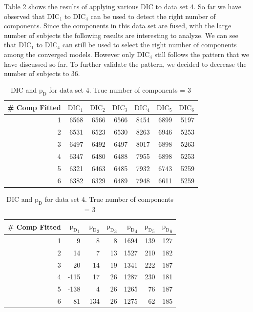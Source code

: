 Table \ref{table : ds_3fused_10ppg_dic} shows the results of applying various DIC to data set 4. So far we have observed that $\text{DIC}_1$ to $\text{DIC}_4$ can be used to detect the right number of components. Since the components in this data set are fused, with the large number of subjects the following results are interesting to analyze. We can see that $\text{DIC}_1$ to $\text{DIC}_4$ can still be used to select the right number of components among the converged models. However only $\text{DIC}_4$ still follows the pattern that we have discussed so far. To further validate the pattern, we decided to decrease the number of subjects to 36.\\
 
\begin{table}[!htb]
\centering
\captionsetup{justification=centering}
\caption{DIC and $\text{p}_\text{D}$ for data set 4. True number of components = 3}
\label{table : ds_3fused_10ppg_dic}
\begin{tabular}{@{}rrrrrrr@{}}
\toprule
\# Comp Fitted & $\text{DIC}_1$ & $\text{DIC}_2$  & $\text{DIC}_3$  & $\text{DIC}_4$  & $\text{DIC}_5$  & $\text{DIC}_6$  \\ \midrule
1 & 6568 & 6566 & 6566 & 8454 & 6899 & 5197 \\
2 & 6531 & 6523 & 6530 & 8263 & 6946 & 5253 \\
3 & 6497 & 6492 & 6497 & 8017 & 6898 & 5263 \\
4 & 6347 & 6480 & 6488 & 7955 & 6898 & 5253 \\
5 & 6321 & 6463 & 6485 & 7932 & 6743 & 5259 \\
6 & 6382 & 6329 & 6489 & 7948 & 6611 & 5259 \\ \bottomrule
\end{tabular}

\begin{tabular}{@{}rrrrrrr@{}}
\toprule
\# Comp Fitted & ${\text{p}_\text{D}}_1$ & ${\text{p}_\text{D}}_2$ & ${\text{p}_\text{D}}_3$ & ${\text{p}_\text{D}}_4$ & ${\text{p}_\text{D}}_5$ & ${\text{p}_\text{D}}_6$ \\ \midrule
1 & 9 & 8 & 8 & 1694 & 139 & 127 \\
2 & 14 & 7 & 13 & 1527 & 210 & 182 \\
3 & 20 & 14 & 19 & 1341 & 222 & 187 \\
4 & -115 & 17 & 26 & 1287 & 230 & 181 \\
5 & -138 & 4 & 26 & 1265 & 76 & 187 \\
6 & -81 & -134 & 26 & 1275 & -62 & 185 \\ \bottomrule
\end{tabular}
\end{table}

